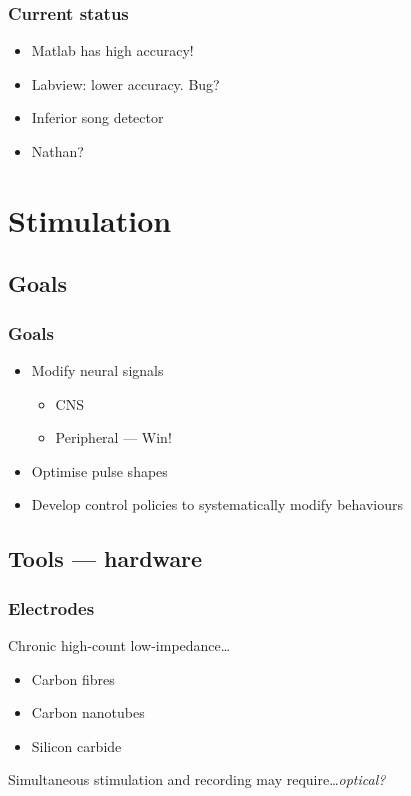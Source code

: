 \documentclass{beamer}
\begin{document}
\begin{frame}
  \frametitle{Current status}
  \begin{itemize}
    \item Matlab has high accuracy!
    \item Labview: lower accuracy.  Bug?
    \item Inferior song detector
    \item Nathan?
  \end{itemize}
\end{frame}


\section{Stimulation}
\subsection{Goals}

\begin{frame}
  \frametitle{Goals}
  \begin{itemize}
  \item Modify neural signals
    \begin{itemize}
    \item CNS
    \item Peripheral --- Win!
    \end{itemize}
  \item Optimise pulse shapes
  \item Develop control policies to systematically modify behaviours
  \end{itemize}
\end{frame}


\subsection{Tools --- hardware}

\begin{frame}
  \frametitle{Electrodes}
  Chronic high-count low-impedance\dots
  \begin{itemize}
    \item Carbon fibres
    \item Carbon nanotubes
    \item Silicon carbide
  \end{itemize}
  Simultaneous stimulation and recording may require\dots {\em optical?}
\end{frame}
\end{document}
